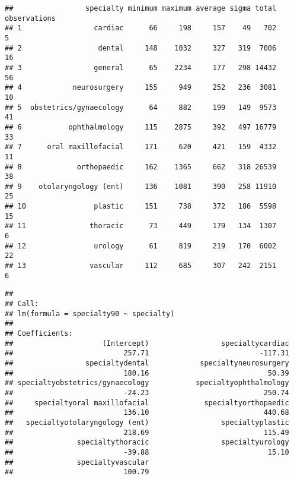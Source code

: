 \documentclass[]{article}
\begin{document}
\begin{verbatim}
##                 specialty minimum maximum average sigma total observations
## 1                 cardiac      66     198     157    49   702            5
## 2                  dental     148    1032     327   319  7006           16
## 3                 general      65    2234     177   298 14432           56
## 4            neurosurgery     155     949     252   236  3081           10
## 5  obstetrics/gynaecology      64     882     199   149  9573           41
## 6           ophthalmology     115    2875     392   497 16779           33
## 7      oral maxillofacial     171     620     421   159  4332           11
## 8             orthopaedic     162    1365     662   318 26539           38
## 9    otolaryngology (ent)     136    1081     390   258 11910           25
## 10                plastic     151     738     372   186  5598           15
## 11               thoracic      73     449     179   134  1307            6
## 12                urology      61     819     219   170  6002           22
## 13               vascular     112     685     307   242  2151            6
\end{verbatim}

\begin{verbatim}
## 
## Call:
## lm(formula = specialty90 ~ specialty)
## 
## Coefficients:
##                     (Intercept)                 specialtycardiac  
##                          257.71                          -117.31  
##                 specialtydental            specialtyneurosurgery  
##                          180.16                            50.39  
## specialtyobstetrics/gynaecology           specialtyophthalmology  
##                          -24.23                           250.74  
##     specialtyoral maxillofacial             specialtyorthopaedic  
##                          136.10                           440.68  
##   specialtyotolaryngology (ent)                 specialtyplastic  
##                          218.69                           115.49  
##               specialtythoracic                 specialtyurology  
##                          -39.88                            15.10  
##               specialtyvascular  
##                          100.79
\end{verbatim}
\end{document}
